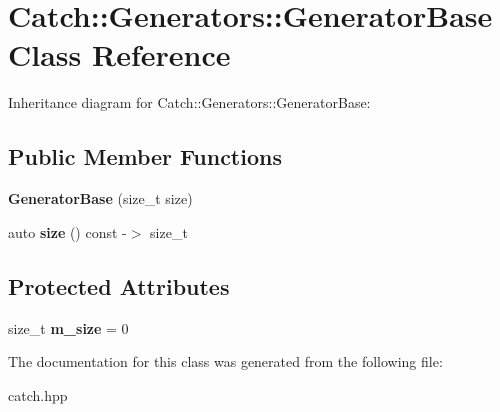 \hypertarget{classCatch_1_1Generators_1_1GeneratorBase}{}\section{Catch\+:\+:Generators\+:\+:Generator\+Base Class Reference}
\label{classCatch_1_1Generators_1_1GeneratorBase}


Inheritance diagram for Catch\+:\+:Generators\+:\+:Generator\+Base\+:
\subsection*{Public Member Functions}
\begin{DoxyCompactItemize}
\item 
\mbox{\label{classCatch_1_1Generators_1_1GeneratorBase_ab003974d458a14acfb48f79e7e8abe21}} 
{\bfseries Generator\+Base} (size\+\_\+t size)
\item 
\mbox{\label{classCatch_1_1Generators_1_1GeneratorBase_a2fb4a5c153f3fdc2708245b40751b487}} 
auto {\bfseries size} () const -\/$>$ size\+\_\+t
\end{DoxyCompactItemize}
\subsection*{Protected Attributes}
\begin{DoxyCompactItemize}
\item 
\mbox{\label{classCatch_1_1Generators_1_1GeneratorBase_ac6ab90adfdda9401e2ea03db5b2dfc6a}} 
size\+\_\+t {\bfseries m\+\_\+size} = 0
\end{DoxyCompactItemize}


The documentation for this class was generated from the following file\+:\begin{DoxyCompactItemize}
\item 
catch.\+hpp\end{DoxyCompactItemize}
